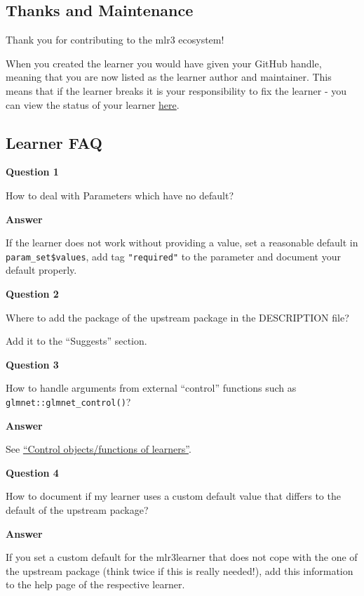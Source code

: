 \documentclass[
]{scrbook}
\begin{document}
\hypertarget{thanks-and-maintenance}{%
\subsection{Thanks and Maintenance}\label{thanks-and-maintenance}}

Thank you for contributing to the mlr3 ecosystem!

When you created the learner you would have given your GitHub handle, meaning that you are now listed as the learner author and maintainer. This means that if the learner breaks it is your responsibility to fix the learner - you can view the status of your learner \href{https://mlr3extralearners.mlr-org.com/articles/learners/learner_status.html}{here}.

\hypertarget{learner-faq}{%
\subsection{Learner FAQ}\label{learner-faq}}

\textbf{Question 1}

How to deal with Parameters which have no default?

\textbf{Answer}

If the learner does not work without providing a value, set a reasonable default in \texttt{param\_set\$values}, add tag \texttt{"required"} to the parameter and document your default properly.

\textbf{Question 2}

Where to add the package of the upstream package in the DESCRIPTION file?

Add it to the ``Suggests'' section.

\textbf{Question 3}

How to handle arguments from external ``control'' functions such as \texttt{glmnet::glmnet\_control()}?

\textbf{Answer}

See \href{https://mlr3book.mlr-org.com/extending-learners.html\#learner-control}{``Control objects/functions of learners''}.

\textbf{Question 4}

How to document if my learner uses a custom default value that differs to the default of the upstream package?

\textbf{Answer}

If you set a custom default for the mlr3learner that does not cope with the one of the upstream package (think twice if this is really needed!), add this information to the help page of the respective learner.
\end{document}
